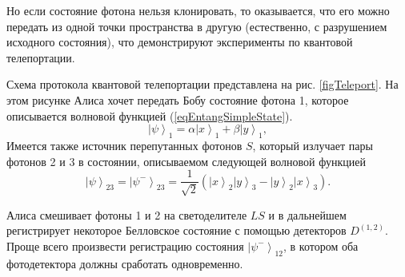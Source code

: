 Но если состояние фотона нельзя клонировать, то оказывается, что его
можно передать из одной точки пространства в другую  
(естественно, с разрушением исходного состояния), что
демонстрируют эксперименты по квантовой телепортации. 



Схема протокола квантовой телепортации представлена на рис.
\ref{figTeleport}. На этом рисунке Алиса хочет передать Бобу  
состояние фотона 1, которое описывается волновой функцией
(\ref{eqEntangSimpleState}). 
\[
\left|\psi\right>_1 = \alpha \left|x\right>_1 +
\beta \left|y\right>_1, 
\]
Имеется также источник перепутанных фотонов $S$, который излучает пары
фотонов 2 и 3 в состоянии, описываемом следующей волновой функцией 
\begin{equation}
  \left|\psi\right>_{23} = \left|\psi^{-}\right>_{23} = \frac{1}{\sqrt{2}}\left(
  \left|x\right>_2\left|y\right>_3 - 
  \left|y\right>_2\left|x\right>_3
  \right).
  \nonumber
\end{equation}

Алиса смешивает фотоны 1 и 2 на светоделителе $LS$ и в дальнейшем
регистрирует некоторое Белловское состояние с помощью детекторов
$D^{(1,2)}$. Проще всего произвести регистрацию состояния
$\left|\psi^{-}\right>_{12}$, в котором оба фотодетектора должны
сработать одновременно.


